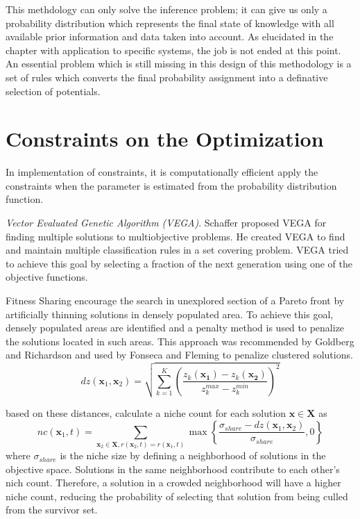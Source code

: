 This methdology can only solve the inference problem; it can give us only a probability distribution which represents the final state of knowledge with all available prior information and data taken into account.  As elucidated in the chapter with application to specific systems, the job is not ended at this point.  An essential problem which is still missing in this design of this methodology is a set of rules which converts the final probability assignment into a definative selection of potentials.



\section{Constraints on the Optimization}

In implementation of constraints, it is computationally efficient apply the constraints when the parameter is estimated from the probability distribution function.

\emph{Vector Evaluated Genetic Algorithm (VEGA)}.  Schaffer proposed VEGA for finding multiple solutions to multiobjective problems.  He created VEGA to find and maintain multiple classification rules in a set covering problem.  VEGA tried to achieve this goal by selecting a fraction of the next generation using one of the objective functions.

Fitness Sharing encourage the search in unexplored section of a Pareto front by artificially thinning solutions in densely populated area.  To achieve this goal, densely populated areas are identified and a penalty method is used to penalize the solutions located in such areas.  This approach was recommended by Goldberg and Richardson\cite{goldberg1987genetic} and used by Fonseca and Fleming\cite{fonseca1993multiobjective} to penalize clustered solutions.
\begin{equation}
    dz(\bm{x}_1,\bm{x}_2)
    = \sqrt{\sum_{k=1}^{K}  \left(\frac{z_k(\bm{x_1})-z_k(\bm{x_2})}
                                       {z_{k}^{max}-z_{k}^{min}}
                            \right)^{2}
      }
\end{equation}

based on these distances, calculate a niche count for each solution $\bm{x}\in\bm{X}$ as
\begin{equation}
  nc(\bm{x}_1,t)=\sum_{\bm{x}_2\in\bm{X},r(\bm{x}_2,t)=r(\bm{x}_1,t)}
      \max\left\{ \frac{\sigma_{share}-dz(\bm{x}_1,\bm{x}_2)}
                       {\sigma_{share}},0
          \right\}
\end{equation}
where $\sigma_{share}$ is the niche size by defining a neighborhood of solutions in the objective space.  Solutions in the same neighborhood contribute to each other's nich count.  Therefore, a solution in a crowded neighborhood will have a higher niche count, reducing the probability of selecting that solution from being culled from the survivor set.


